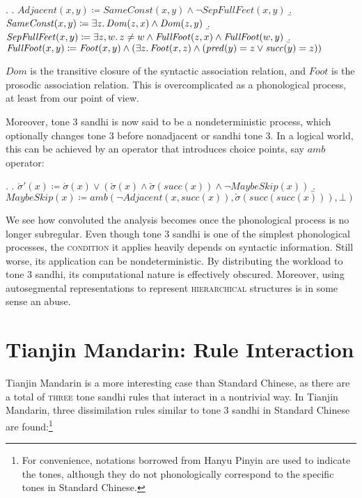 \documentclass[12pt, a4paper]{report}
\newcommand{\textemph}[1]{\textsc{#1}}
\begin{document}
\ex.
\a. \(\mathit{Adjacent}(x, y) \coloneq \mathit{SameConst}(x, y) \land
\neg\mathit{SepFullFeet}(x, y)\)
\b. \(\mathit{SameConst}(x, y) \coloneq \exists z\ldotp
\mathit{Dom}(z, x) \land \mathit{Dom}(z, y)\)
\b. \(\mathit{SepFullFeet}(x, y) \coloneq \exists z, w\ldotp
z \neq w \land \mathit{FullFoot}(z, x) \land \mathit{FullFoot}(w, y)\)
\b. \(\mathit{FullFoot}(x, y) \coloneq \mathit{Foot}(x, y) \land
(\exists z\ldotp \mathit{Foot}(x, z) \land
(\mathit{pred}(y) = z \lor \mathit{succ}(y) = z))\)

\(\mathit{Dom}\) is the transitive closure of the syntactic
association relation, and \(\mathit{Foot}\) is the prosodic
association relation.  This is overcomplicated as a phonological
process, at least from our point of view.

Moreover, tone 3 sandhi is now said to be a nondeterministic process,
which optionally changes tone 3 before nonadjacent or sandhi tone 3.
In a logical world, this can be achieved by an operator that
introduces choice points, say  \(\mathit{amb}\)
operator:

\ex.
\a. \(\acute{\sigma}'(x) \coloneq \acute{\sigma}(x) \lor
(\check{\sigma}(x) \land \check{\sigma}(\mathit{succ}(x))
\land \neg\mathit{MaybeSkip}(x))\)
\b. \(\mathit{MaybeSkip}(x) \coloneq
\mathit{amb}(\neg\mathit{Adjacent}(x, \mathit{succ}(x)),
\check{\sigma}(\mathit{succ}(\mathit{succ}(x))), \bot)\)

We see how convoluted the analysis becomes once the phonological
process is no longer subregular.  Even though tone 3 sandhi is one of
the simplest phonological processes, the \textemph{condition} it
applies heavily depends on syntactic information.  Still worse, its
application can be nondeterministic.  By distributing the workload to
tone 3 sandhi, its computational nature is effectively obscured.
Moreover, using autosegmental representations to represent
\textemph{hierarchical} structures is in some sense an abuse.

\section{Tianjin Mandarin: Rule Interaction}
Tianjin Mandarin is a more interesting case than Standard Chinese, as
there are a total of \textemph{three} tone sandhi rules that interact
in a nontrivial way.  In Tianjin Mandarin, three dissimilation rules
similar to tone 3 sandhi in Standard Chinese are found:\footnote{For
  convenience, notations borrowed from Hanyu Pinyin are used to
  indicate the tones, although they do not phonologically correspond
  to the specific tones in Standard Chinese.}
\end{document}
